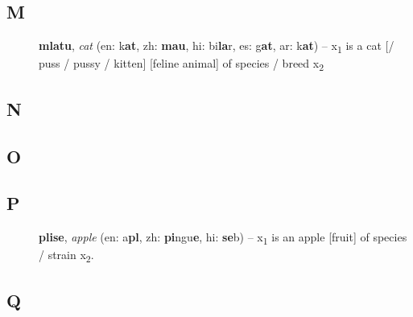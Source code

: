 \documentclass[12pt]{book}
\begin{document}
\begin{description}
\item[ ]
\end{description}

\subsection{M} %

\begin{description}
\item[ ] \textbf{mlatu}, \textit{cat} (en: k\textbf{at}, zh: \textbf{mau}, hi: bi\textbf{la}r, es: g\textbf{at}, ar: k\textbf{at}) -- x\textsubscript{1} is a cat [/ puss / pussy / kitten] [feline animal] of species / breed x\textsubscript{2}
\end{description}

\subsection{N} %

\begin{description}
\item[ ]
\end{description}

\subsection{O} %

\begin{description}
\item[ ]
\end{description}

\subsection{P} %

\begin{description}
\item[ ] \textbf{plise}, \textit{apple} (en: a\textbf{pl}, zh: \textbf{pi}ngu\textbf{e}, hi: \textbf{se}b) -- x\textsubscript{1} is an apple [fruit] of species / strain x\textsubscript{2}.
\end{description}

\subsection{Q} %
\end{document}
